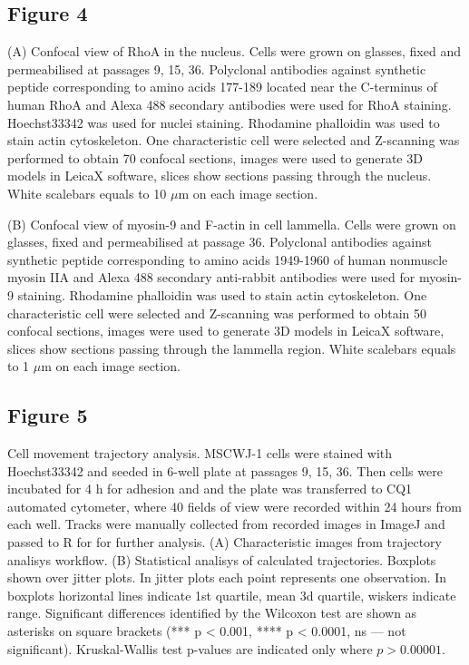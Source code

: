 \documentclass[alpha-refs]{wiley-article}
\begin{document}
\subsection*{Figure 4}
(A) Confocal view of RhoA in the nucleus.
Cells were grown on glasses, fixed and permeabilised at passages 9, 15, 36.
Polyclonal antibodies against synthetic peptide corresponding to amino acids 177-189 located near the C-terminus of human RhoA and Alexa 488 secondary antibodies were used for RhoA staining.
Hoechst33342 was used for nuclei staining.
Rhodamine phalloidin was used to stain actin cytoskeleton.
One characteristic cell were selected and Z-scanning was performed to obtain 70 confocal sections, images were used to generate 3D models in LeicaX software, slices show sections passing through the nucleus.
White scalebars equals to 10 $\mu$m on each image section.

(B) Confocal view of myosin-9 and F-actin in cell lammella.
Cells were grown on glasses, fixed and permeabilised at passage 36.
Polyclonal antibodies against synthetic peptide corresponding to amino acids 1949-1960 of human nonmuscle myosin IIA and Alexa 488 secondary anti-rabbit antibodies were used for myosin-9 staining.
Rhodamine phalloidin was used to stain actin cytoskeleton.
One characteristic cell were selected and Z-scanning was performed to obtain 50 confocal sections, images were used to generate 3D models in LeicaX software, slices show sections passing through the lammella region.
White scalebars equals to 1 $\mu$m on each image section.


\subsection*{Figure 5}
Cell movement trajectory analysis.
MSCWJ-1 cells were stained with Hoechst33342 and seeded in 6-well plate at passages 9, 15, 36.
Then cells were incubated for 4 h for adhesion and and the plate was transferred to CQ1 automated cytometer, where 40 fields of view were recorded within 24 hours from each well.
Tracks were manually collected from recorded images in ImageJ and passed to R for for further analysis.
(A) Characteristic images from trajectory analisys workflow.
(B) Statistical analisys of calculated trajectories.
Boxplots shown over jitter plots.
In jitter plots each point represents one observation.
In boxplots horizontal lines indicate 1st quartile, mean 3d quartile, wiskers indicate range.
Significant differences identified by the Wilcoxon test are shown as asterisks on square brackets (*** p < 0.001, **** p < 0.0001, ns --- not significant).
Kruskal-Wallis test p-values are indicated only where $p > 0.00001$.
\end{document}
